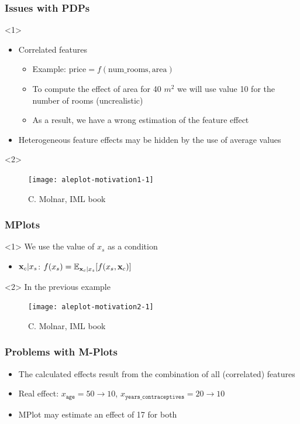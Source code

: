 \begin{frame}
  \frametitle{Issues with PDPs}
  \begin{onlyenv}<1>
    \begin{itemize}
    \item Correlated features
      \begin{itemize}
      \item Example: $\text{price} = f(\text{num\_rooms}, \text{area})$
      \item To compute the effect of area for 40 $m^2$ we will use value 10 for
        the number of rooms (uncrealistic)
      \item As a result, we have a wrong estimation of the feature effect
      \end{itemize}
    \item Heterogeneous feature effects may be hidden by the use of average values
    \end{itemize}
  \end{onlyenv}
  \begin{onlyenv}<2>
    \begin{figure}
      \texttt{[image: aleplot-motivation1-1]}
      \caption{\footnotesize C. Molnar, IML book}
    \end{figure}
  \end{onlyenv}
\end{frame}

\begin{frame}
  \frametitle{MPlots}

  \begin{onlyenv}<1>
    We use the value of $x_s$ as a condition
    \begin{itemize}
    \item \(\mathbf{x}_c|x_s\): \(f(x_s) = \mathbb{E}_{\mathbf{x}_c|x_s}[f(x_s, \mathbf{x}_c)]\)
    \end{itemize}
  \end{onlyenv}
  \begin{onlyenv}<2>
    In the previous example
    \begin{figure}
      \texttt{[image: aleplot-motivation2-1]}
      \caption{\footnotesize C. Molnar, IML book}
    \end{figure}
  \end{onlyenv}
\end{frame}

\begin{frame}
  \frametitle{Problems with M-Plots}
  \begin{itemize}
  \item The calculated effects result from the combination of all (correlated) features
  \item Real effect: \(x_{\mathtt{age}} = 50 \rightarrow 10\), \(x_{\mathtt{years\_contraceptives}} = 20 \rightarrow 10\)
  \item MPlot may estimate an effect of 17 for both
  \end{itemize}
\end{frame}

